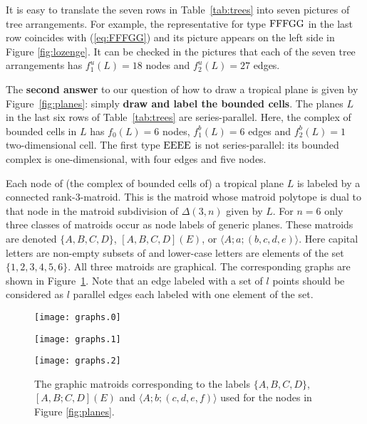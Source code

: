 \documentclass[12pt,a4paper]{amsart}
\theoremstyle{definition}
\begin{document}
It is easy to translate the seven rows in Table~\ref{tab:trees} into
seven pictures of tree arrangements. For example, the representative
for type ${\rm FFFGG}$ in the last row coincides with (\ref{eq:FFFGG})
and its picture appears on the left side in Figure \ref{fig:lozenge}.
It can be checked in the pictures that each of the seven tree
arrangements has $f_1^{u} (L) = 18$ nodes and $f_2^{u} (L) = 27$
edges.

The \textbf{second answer} to our question of how to draw a tropical
plane is given by Figure~\ref{fig:planes}: simply \textbf{draw and
  label the bounded cells}.  The planes $L$ in the last six rows of
Table~\ref{tab:trees} are series-parallel. Here, the complex of
bounded cells in $L$ has $f_0(L) = 6$ nodes, $f_1^b(L) = 6$ edges and
$f_2^b(L) = 1$ two-dimensional cell.  The first type ${\rm EEEE}$ is
not series-parallel: its bounded complex is one-dimensional,
with four edges and five nodes.

Each node of (the complex of bounded cells of) a tropical plane $L$ is
labeled by a connected rank-$3$-matroid. This is the matroid whose
matroid polytope is dual to that node in the matroid subdivision of
$\Delta(3,n)$ given by $L$.  For $n=6$ only three classes of matroids
occur as node labels of generic planes.  These matroids are denoted
$\{A,B,C,D\}$, $[A,B,C,D](E)$, or $\langle A;a;(b,c,d,e)\rangle$.
Here capital letters are non-empty subsets of and lower-case letters
are elements of the set $\{1,2,3,4,5,6\}$. All three matroids are
graphical.  The corresponding graphs are shown in
Figure~\ref{fig:graphs}.  Note that an edge labeled with a set of $l$
points should be considered as $l$ parallel edges each labeled with
one element of the set.

\begin{figure}[htb]\centering
  \begin{minipage}[c]{.25\textwidth}\centering
    \texttt{[image: graphs.0]}
  \end{minipage}
  \begin{minipage}[c]{.25\textwidth}\centering
    \texttt{[image: graphs.1]}
  \end{minipage}
  \begin{minipage}[c]{.25\textwidth}\centering
    \texttt{[image: graphs.2]}
  \end{minipage}
  \caption{The graphic matroids corresponding to the labels
    $\{A,B,C,D\}$, $[A,B;C,D](E)$ and $\langle A;b;(c,d,e,f)\rangle$
    used for the nodes in Figure \ref{fig:planes}.}
  \label{fig:graphs}
\end{figure}
\end{document}
